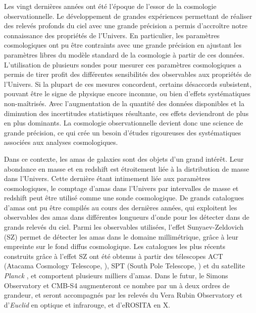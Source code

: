 Les vingt dernières années ont été l'époque de l'essor de la cosmologie observationnelle.
Le développement de grandes expériences permettant de réaliser des relevés profonds du ciel avec une grande précision a permis d'accroître notre connaissance des propriétés de l'Univers.
En particulier, les paramètres cosmologiques ont pu être contraints avec une grande précision en ajustant les paramètres libres du modèle standard de la cosmologie à partir de ces données.
L'utilisation de plusieurs sondes pour mesurer ces paramètres cosmologiques a permis de tirer profit des différentes sensibilités des observables aux propriétés de l'Univers.
Si la plupart de ces mesures concordent, certains désaccords subsistent, pouvant être le signe de physique encore inconnue, ou bien d'effets systématiques non-maîtrisés.
Avec l'augmentation de la quantité des données disponibles et la diminution des incertitudes statistiques résultante, ces effets deviendront de plus en plus dominants.
La cosmologie observationnelle devient donc une science de grande précision, ce qui crée un besoin d'études rigoureuses des systématiques associées aux analyses cosmologiques.

Dans ce contexte, les amas de galaxies sont des objets d'un grand intérêt.
Leur abondance en masse et en redshift est étroitement liée à la distribution de masse dans l'Univers.
Cette dernière étant intimement liée aux paramètres cosmologiques, le comptage d'amas dans l'Univers par intervalles de masse et redshift peut être utilisé comme une sonde cosmologique.
De grands catalogues d'amas ont pu être compilés au cours des dernières années, qui exploitent les observables des amas dans différentes longueurs d'onde pour les détecter dans de grands relevés du ciel.
Parmi les observables utilisées, l'effet Sunyaev-Zeldovich (SZ) permet de détecter les amas dans le domaine millimétrique, grâce à leur empreinte sur le fond diffus cosmologique.
Les catalogues les plus récents construits grâce à l'effet SZ ont été obtenus à partir des télescopes ACT (Atacama Cosmology Telescope, \cite{hilton_atacama_2021}), SPT (South Pole Telescope, \cite{bleem_galaxy_2015,bleem_sptpol_2020}) et du satellite \textit{Planck} \cite{planck_collaboration_planck_2016-2}, et comportent plusieurs milliers d'amas.
Dans le futur, le Simons Observatory \cite{ade_simons_2019} et CMB-S4 \cite{abazajian_cmb-s4_2016} augmenteront ce nombre par un à deux ordres de grandeur, et seront accompagnés par les relevés du Vera Rubin Observatory \cite{lsst_dark_energy_science_collaboration_large_2012} et d'\textit{Euclid} \cite{sartoris_next_2016} en optique et infrarouge, et d'eROSITA \cite{pillepich_forecasts_2018} en X.

